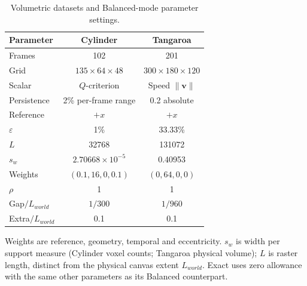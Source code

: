 \begin{table}[t]
\centering
\caption{Volumetric datasets and Balanced-mode parameter settings.}
\label{tab:volume-parameters}
\footnotesize
\setlength{\tabcolsep}{2pt}
\renewcommand{\arraystretch}{0.95}
\begin{tabular}{@{}lcc@{}}
\toprule
Parameter & Cylinder & Tangaroa \\
\midrule
Frames & 102 & 201 \\
Grid & $135\times64\times48$ & $300\times180\times120$ \\
Scalar & $Q$-criterion & Speed $\|\mathbf{v}\|$ \\
Persistence & 2\% per-frame range & 0.2 absolute \\
Reference & $+x$ & $+x$ \\
$\varepsilon$ & 1\% & 33.33\% \\
$L$ & 32768 & 131072 \\
$s_w$ & $2.70668\times10^{-5}$ & 0.40953 \\
Weights & $(0.1,16,0,0.1)$ & $(0,64,0,0)$ \\
$\rho$ & 1 & 1 \\
Gap$/L_{world}$ & $1/300$ & $1/960$ \\
Extra$/L_{world}$ & 0.1 & 0.1 \\
\bottomrule
\end{tabular}
\vspace{2pt}
\begin{minipage}{0.94\columnwidth}\footnotesize Weights are reference, geometry, temporal and eccentricity. $s_w$ is width per support measure (Cylinder voxel counts; Tangaroa physical volume); $L$ is raster length, distinct from the physical canvas extent $L_{world}$. Exact uses zero allowance with the same other parameters as its Balanced counterpart.\end{minipage}
\end{table}
